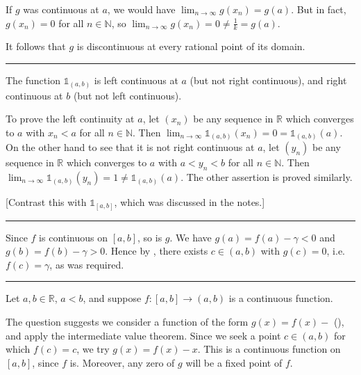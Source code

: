 \documentclass[letterpaper,10pt,english]{jupyterBook}
\begin{document}
\sphinxAtStartPar
If \(g\) was continuous at \(a\), we would have \(\lim_{n\rightarrow\infty}g(x_n)=g(a)\). But in fact, \(g(x_n)=0\) for all \(n\in\mathbb{N}\), so \(\lim_{n\rightarrow\infty}g(x_n)=0\neq \frac{1}{k}=g(a)\).

\sphinxAtStartPar
It follows that \(g\) is discontinuous at every rational point of its domain.


\bigskip\hrule\bigskip


\sphinxAtStartPar
{\hyperref[\detokenize{Problems:id23}]{}} The function \(\mathbb{1}_{(a, b)}\) is left continuous at \(a\) (but not right continuous), and right continuous at \(b\) (but not left continuous).

\sphinxAtStartPar
To prove the left continuity at \(a\), let \((x_{n})\) be any sequence in \(\mathbb{R}\) which converges to \(a\) with \(x_{n} < a\) for all \(n\in\mathbb{N}\). Then \(\lim_{n\rightarrow\infty} \mathbb{1}_{(a, b)}(x_{n}) = 0 = \mathbb{1}_{(a, b)}(a).\) On the other hand to see that it is not right continuous at \(a\), let \((y_{n})\) be any sequence in \(\mathbb{R}\) which converges to \(a\) with \(a < y_{n} < b\) for all \(n\in\mathbb{N}\). Then
\( \lim_{n\rightarrow\infty} \mathbb{1}_{(a, b)}(y_{n}) = 1 \neq \mathbb{1}_{(a, b)}(a). \) The other assertion is proved similarly.

{[}Contrast this with \(\mathbb{1}_{[a, b]}\), which was discussed in the notes.{]}


\bigskip\hrule\bigskip


\sphinxAtStartPar
{\hyperref[\detokenize{Problems:id24}]{}} Since \(f\) is continuous on \([a, b]\), so is \(g\). We have \(g(a) = f(a) - \gamma < 0\) and \(g(b) = f(b) - \gamma > 0\). Hence by , there exists \(c \in (a, b)\) with \(g(c) = 0\), i.e. \(f(c) = \gamma\), as was required.


\bigskip\hrule\bigskip

\label{\detokenize{Solutions-upto46:id10}}
\sphinxAtStartPar
{\hyperref[\detokenize{Problems:id25}]{}}
Let \(a,b\in\mathbb{R}\), \(a<b\), and suppose \(f:[a,b] \rightarrow (a,b)\) is a continuous function.

\sphinxAtStartPar
The question suggests we consider a function of the form \(g(x) = f(x) - \) (), and apply the intermediate value theorem. Since we seek a point \(c\in(a,b)\) for which \(f(c)=c\), we try \(g(x)=f(x)-x\). This is a continuous function on \([a,b]\), since \(f\) is. Moreover, any zero of \(g\) will be a fixed point of \(f\).
\end{document}
